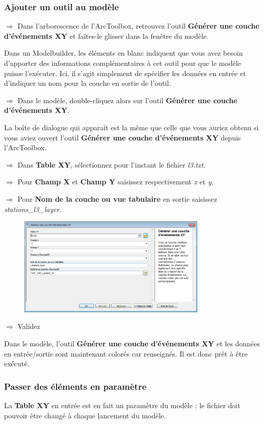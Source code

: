 \documentclass[11pt]{article}
\newcommand{\action}{$\Rightarrow$ }
\begin{document}
\subsubsection{Ajouter un outil au modèle}
\action Dans l'arborescence de l'ArcToolbox, retrouvez l'outil \textbf{Générer une couche d'événements XY} et faîtes-le glisser dans la fenêtre du modèle.

Dans un Modelbuilder, les éléments en blanc indiquent que vous avez besoin d'apporter des informations complémentaires à cet outil pour que le modèle puisse l'exécuter. Ici, il s'agit simplement de spécifier les données en entrée et d'indiquer un nom pour la couche en sortie de l'outil.

\action Dans le modèle, double-cliquez alors sur l'outil \textbf{Générer une couche d'événements XY}.

La boîte de dialogue qui apparaît est la même que celle que vous auriez obtenu si vous aviez ouvert l'outil \textbf{Générer une couche d'événements XY} depuis l'ArcToolbox.

\action Dans \textbf{Table XY}, sélectionnez pour l'instant le fichier \textit{l3.txt}.

\action Pour \textbf{Champ X} et \textbf{Champ Y} saisissez respectivement \textit{x} et \textit{y}.

\action Pour \textbf{Nom de la couche ou vue tabulaire} en sortie saisissez \textit{stations\_l3\_layer}.
\begin{figure}[H]
	\center \includegraphics[width=0.8\textwidth]{img/td3/modelbuilder_creation-2.png}\\
\end{figure}

\action Validez

Dans le modèle, l'outil \textbf{Générer une couche d'événements XY} et les données en entrée/sortie sont maintenant colorés car renseignés. Il est donc prêt à être exécuté. 


\subsubsection{Passer des éléments en paramètre}
La \textbf{Table XY} en entrée est en fait un paramètre du modèle : le fichier doit pouvoir être changé à chaque lancement du modèle.
\end{document}
